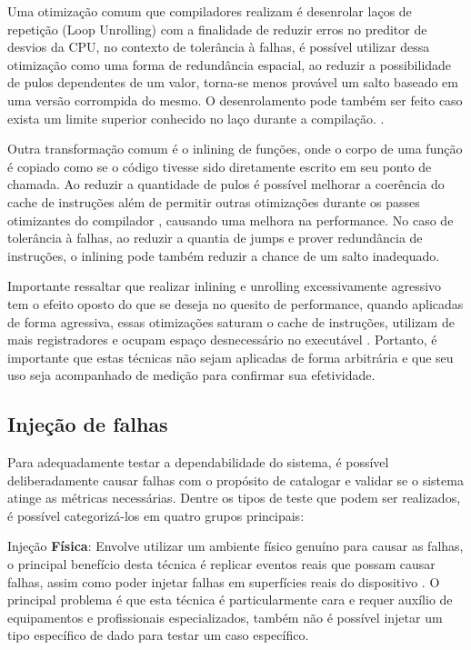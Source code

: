 Uma otimização comum que compiladores realizam é desenrolar laços de repetição (Loop Unrolling) com a finalidade de reduzir erros no preditor de desvios da CPU, no contexto de tolerância à falhas, é possível utilizar dessa otimização como uma forma de redundância espacial, ao reduzir a possibilidade de pulos dependentes de um valor, torna-se menos provável um salto baseado em uma versão corrompida do mesmo. O desenrolamento pode também ser feito caso exista um limite superior conhecido no laço durante a compilação. \cite{LoopUnrollingARM}.

Outra transformação comum é o inlining de funções, onde o corpo de uma função é copiado como se o código tivesse sido diretamente escrito em seu ponto de chamada. Ao reduzir a quantidade de pulos é possível melhorar a coerência do cache de instruções além de permitir outras otimizações durante os passes otimizantes do compilador \cite{EngineeringACompiler}, causando uma melhora na performance. No caso de tolerância à falhas, ao reduzir a quantia de jumps e prover redundância de instruções, o inlining pode também reduzir a chance de um salto inadequado. %

Importante ressaltar que realizar inlining e unrolling excessivamente agressivo tem o efeito oposto do que se deseja no quesito de performance, quando aplicadas de forma agressiva, essas otimizações saturam o cache de instruções, utilizam de mais registradores e ocupam espaço desnecessário no executável \cite{EngineeringACompiler}. Portanto, é importante que estas técnicas não sejam aplicadas de forma arbitrária e que seu uso seja acompanhado de medição para confirmar sua efetividade.

\subsection{Injeção de falhas}

Para adequadamente testar a dependabilidade do sistema, é possível deliberadamente causar falhas com o propósito de catalogar e validar se o sistema atinge as métricas necessárias. Dentre os tipos de teste que podem ser realizados, é possível categorizá-los em quatro grupos principais:

Injeção \textbf{Física}: Envolve utilizar um ambiente físico genuíno para causar as falhas, o principal benefício desta técnica é replicar eventos reais que possam causar falhas, assim como poder injetar falhas em superfícies reais do dispositivo \cite{FaultInjectionTechniques}. O principal problema é que esta técnica é particularmente cara e requer auxílio de equipamentos e profissionais especializados, também não é possível injetar um tipo específico de dado para testar um caso específico.

